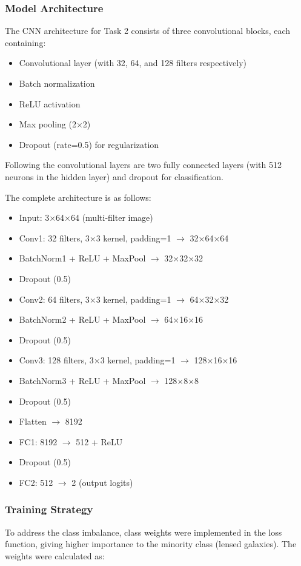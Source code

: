\documentclass[11pt,a4paper]{article}
\begin{document}
\subsubsection{Model Architecture}
The CNN architecture for Task 2 consists of three convolutional blocks, each containing:
\begin{itemize}
    \item Convolutional layer (with 32, 64, and 128 filters respectively)
    \item Batch normalization
    \item ReLU activation
    \item Max pooling (2×2)
    \item Dropout (rate=0.5) for regularization
\end{itemize}

Following the convolutional layers are two fully connected layers (with 512 neurons in the hidden layer) and dropout for classification.

The complete architecture is as follows:
\begin{itemize}
    \item Input: 3×64×64 (multi-filter image)
    \item Conv1: 32 filters, 3×3 kernel, padding=1 $\rightarrow$ 32×64×64
    \item BatchNorm1 + ReLU + MaxPool $\rightarrow$ 32×32×32
    \item Dropout (0.5)
    \item Conv2: 64 filters, 3×3 kernel, padding=1 $\rightarrow$ 64×32×32
    \item BatchNorm2 + ReLU + MaxPool $\rightarrow$ 64×16×16
    \item Dropout (0.5)
    \item Conv3: 128 filters, 3×3 kernel, padding=1 $\rightarrow$ 128×16×16
    \item BatchNorm3 + ReLU + MaxPool $\rightarrow$ 128×8×8
    \item Dropout (0.5)
    \item Flatten $\rightarrow$ 8192
    \item FC1: 8192 $\rightarrow$ 512 + ReLU
    \item Dropout (0.5)
    \item FC2: 512 $\rightarrow$ 2 (output logits)
\end{itemize}

\subsubsection{Training Strategy}
To address the class imbalance, class weights were implemented in the loss function, giving higher importance to the minority class (lensed galaxies). The weights were calculated as:
\end{document}

